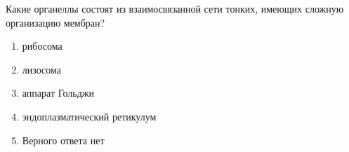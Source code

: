 
Какие органеллы состоят из взаимосвязанной сети тонких, имеющих сложную организацию мембран?

\begin{enumerate}
    \item рибосома
    \item лизосома
    \item аппарат Гольджи
    \item эндоплазматический ретикулум
    \item Верного ответа нет
\end{enumerate}



